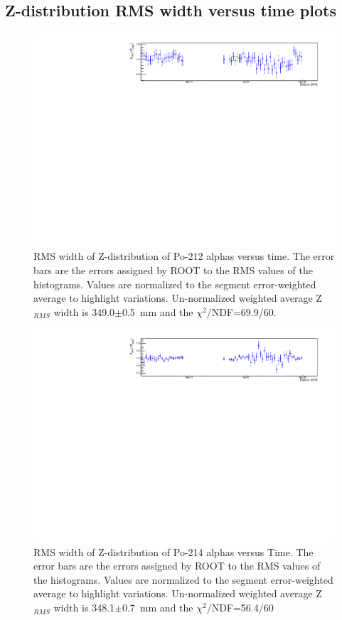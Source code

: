 \subsection{Z-distribution RMS width versus time plots}
\begin{figure}[!h]
\centering
\includegraphics[width=1.05\textwidth]{figures/PubBiPo212ZrmsvsT.pdf}
\caption{\label{fig:ZRMSvsT212}RMS width of Z-distribution of Po-212 alphas versus time. The error bars are the errors assigned by ROOT to the RMS values of the histograms. Values are normalized to the segment error-weighted average to highlight variations. Un-normalized weighted average Z$_{RMS}$ width is 349.0$\pm$0.5~mm and the $\chi^2$/NDF=69.9/60. }
\end{figure}
\begin{figure}[!h]
\centering
\includegraphics[width=1.05\textwidth]{figures/PubBiPo214ZrmsvsT.pdf}
\caption{\label{fig:ZRMSvsT214}RMS width of Z-distribution of Po-214 alphas versus Time. The error bars are the errors assigned by ROOT to the RMS values of the histograms. Values are normalized to the segment error-weighted average to highlight variations. Un-normalized weighted average Z$_{RMS}$ width is 348.1$\pm$0.7~mm and the $\chi^2$/NDF=56.4/60}
\end{figure}
\newpage
